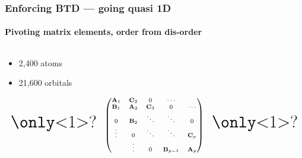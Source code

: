 \begin{frame}
  \frametitle{Enforcing BTD --- going quasi 1D}
  \framesubtitle{Pivoting matrix elements, order from dis-order}

  \begin{columns}
    \begin{column}{.45\linewidth}
      \begin{itemize}
        \item 2,400 atoms
        \item 21,600 orbitals
      \end{itemize}
      
      \begin{equation*}
        \scriptsize
        \text{\huge \only<1>{?}}\quad
        \begin{pmatrix}
          \mathbf A_1 & \mathbf C_2 & 0 & \cdots & \\
          \mathbf B_1 & \mathbf A_2 & \mathbf C_3 & 0& \cdots \\
          0 & \mathbf B_2 &\ddots & \ddots & 0 \\
          \vdots & 0  & \ddots &  \ddots & \mathbf C_p \\
          & \vdots  & 0  & \mathbf B_{p-1} & \mathbf A_p\\
        \end{pmatrix}\quad\text{\huge \only<1>{?}}
      \end{equation*}
      

\end{column}
\end{columns}
\end{frame}

